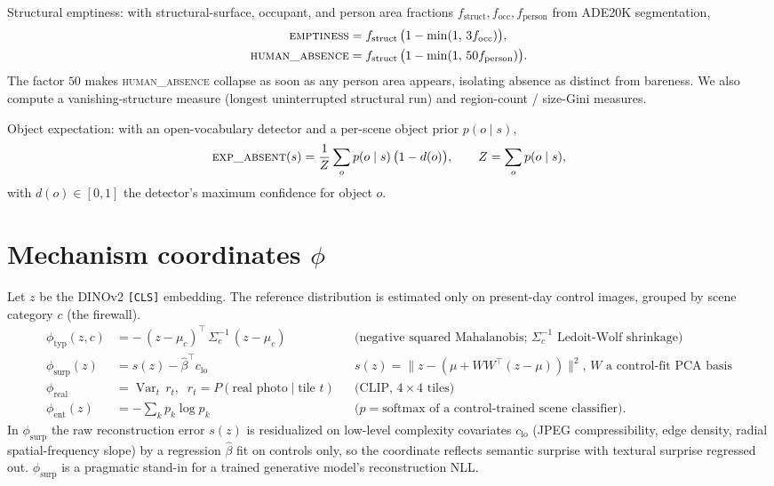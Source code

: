 \documentclass[11pt]{article}
\begin{document}
Structural emptiness: with structural-surface, occupant, and person area
fractions $f_{\text{struct}},f_{\text{occ}},f_{\text{person}}$ from ADE20K segmentation,
\begin{align}
\textsc{emptiness} &= f_{\text{struct}}\,\bigl(1-\min(1,\,3 f_{\text{occ}})\bigr),\\
\textsc{human\_absence} &= f_{\text{struct}}\,\bigl(1-\min(1,\,50 f_{\text{person}})\bigr).
\end{align}
The factor $50$ makes \textsc{human\_absence} collapse as soon as any person area appears,
isolating absence as distinct from bareness. We also compute a vanishing-structure measure
(longest uninterrupted structural run) and region-count / size-Gini measures.

Object expectation: with an open-vocabulary detector and a per-scene object prior
$p(o\mid s)$,
\begin{equation}
\textsc{exp\_absent}(s)=\frac{1}{Z}\sum_{o} p(o\mid s)\,\bigl(1-d(o)\bigr),
\qquad Z=\sum_o p(o\mid s),
\end{equation}
with $d(o)\in[0,1]$ the detector's maximum confidence for object $o$.

\section{Mechanism coordinates \texorpdfstring{$\phi$}{phi}}

Let $z$ be the DINOv2 \texttt{[CLS]} embedding. The reference distribution is estimated
only on present-day control images, grouped by scene category $c$ (the firewall).
\begin{align}
\phi_{\text{typ}}(z,c) &= -\,(z-\mu_c)^{\!\top}\,\Sigma_c^{-1}\,(z-\mu_c)
   && \text{(negative squared Mahalanobis; $\Sigma_c^{-1}$ Ledoit-Wolf shrinkage)}\\
\phi_{\text{surp}}(z) &= s(z) - \hat\beta^{\!\top} c_{\text{lo}}
   && \text{$s(z)=\lVert z-(\mu+WW^{\!\top}(z-\mu))\rVert^2$, $W$ a control-fit PCA basis}\\
\phi_{\text{real}} &= \operatorname{Var}_t\, r_t,\;\; r_t=P(\text{real photo}\mid\text{tile }t)
   && \text{(CLIP, $4\times4$ tiles)}\\
\phi_{\text{ent}}(z) &= -\textstyle\sum_k p_k\log p_k
   && \text{($p=\mathrm{softmax}$ of a control-trained scene classifier).}
\end{align}
In $\phi_{\text{surp}}$ the raw reconstruction error $s(z)$ is residualized on low-level
complexity covariates $c_{\text{lo}}$ (JPEG compressibility, edge density, radial
spatial-frequency slope) by a regression $\hat\beta$ fit on controls only, so the
coordinate reflects semantic surprise with textural surprise regressed out. $\phi_{\text{surp}}$ is a
pragmatic stand-in for a trained generative model's reconstruction NLL.
\end{document}
